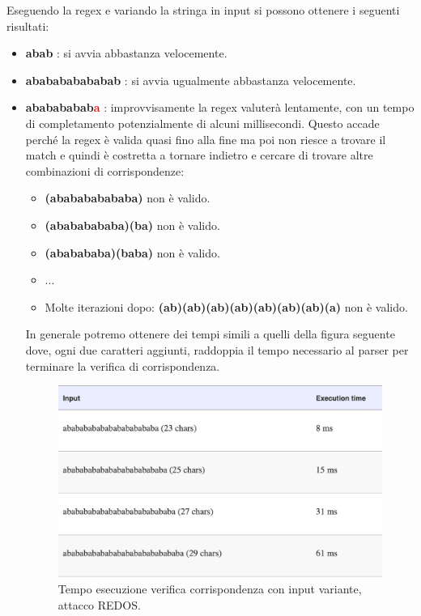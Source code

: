 Eseguendo la regex e variando la stringa in input si possono ottenere i seguenti risultati:
\begin{itemize}
	\item \textbf{abab} : si avvia abbastanza velocemente.
	\item \textbf{ababababababab} : si avvia ugualmente abbastanza velocemente.
	\item \textbf{ababababab\textcolor{red}{a}} : improvvisamente la regex valuterà lentamente, con un tempo di completamento
	potenzialmente di alcuni millisecondi. Questo accade perché la regex è valida quasi fino alla fine ma poi non riesce a trovare il match e quindi è costretta a tornare indietro e cercare di trovare altre combinazioni di corrispondenze:
	\begin{itemize}
		\item \textbf{(ababababababa)} non è valido.
		\item \textbf{(abababababa)(ba)} non è valido.
		\item \textbf{(ababababa)(baba)} non è valido.
		\item ...
		\item Molte iterazioni dopo: \textbf{(ab)(ab)(ab)(ab)(ab)(ab)(ab)(a)} non 		è valido.
	\end{itemize}
	
	In generale potremo ottenere dei tempi simili a quelli della figura seguente dove, ogni due caratteri aggiunti, raddoppia il tempo necessario al parser per terminare la verifica di corrispondenza.
	
	\begin{figure}[H]
		\centering
		\includegraphics[width=12cm, keepaspectratio]{capitoli/web_security/imgs/regex_dos.png}
		\caption{Tempo esecuzione verifica corrispondenza con input variante, attacco REDOS.}
		\label{fig:regex_dos}
	\end{figure}
\end{itemize}

